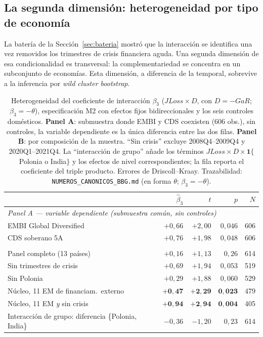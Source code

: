 \subsection{La segunda dimensión: heterogeneidad por tipo de economía}
\label{sec:hetero}

La batería de la Sección~\ref{sec:bateria} mostró que la interacción se identifica una vez removidos los trimestres de crisis financiera aguda. Una segunda dimensión de esa condicionalidad es transversal: la complementariedad se concentra en un subconjunto de economías. Esta dimensión, a diferencia de la temporal, sobrevive a la inferencia por \textit{wild cluster bootstrap}.

\begin{table}[t]
\centering
\small
\setlength{\tabcolsep}{5pt}
\caption[Heterogeneidad del coeficiente de interacción $\beta_3$]{Heterogeneidad del coeficiente de interacción $\beta_3$ ($JLoss\times D$, con $D=-GaR$; $\beta_3=-\theta$), especificación M2 con efectos fijos bidireccionales y los seis controles domésticos. \textbf{Panel A}: submuestra donde EMBI y CDS coexisten (606 obs.), sin controles, la variable dependiente es la única diferencia entre las dos filas. \textbf{Panel B}: por composición de la muestra. ``Sin crisis'' excluye 2008Q4--2009Q4 y 2020Q1--2021Q4. La ``interacción de grupo'' añade los términos $JLoss\times D\times\mathbf{1}\{$Polonia o India$\}$ y los efectos de nivel correspondientes; la fila reporta el coeficiente del triple producto. Errores de Driscoll--Kraay. Trazabilidad: \texttt{NUMEROS\_CANONICOS\_BBG.md} (en forma $\theta$; $\beta_3=-\theta$).}
\label{tab:hetero}
\begin{tabular}{lrrrr}
\toprule
 & $\hat\beta_3$ & $t$ & $p$ & $N$ \\
\midrule
\multicolumn{5}{l}{\textit{Panel A --- variable dependiente (submuestra común, sin controles)}}\\
\quad EMBI Global Diversified & $+0{,}66$ & $+2{,}00$ & $0{,}046$ & 606 \\
\quad CDS soberano 5A         & $+0{,}76$ & $+1{,}98$ & $0{,}048$ & 606 \\
\addlinespace
\multicolumn{5}{l}{\textit{Panel B --- composición de la muestra}}\\
\quad Panel completo (13 países)               & $+0{,}16$ & $+1{,}13$ & $0{,}26$  & 614 \\
\quad Sin trimestres de crisis                 & $+0{,}69$ & $+1{,}94$ & $0{,}053$ & 519 \\
\quad Sin Polonia                              & $+0{,}29$ & $+1{,}88$ & $0{,}060$ & 529 \\
\quad Núcleo, 11 EM de financiam.\ externo & $\mathbf{+0{,}47}$ & $\mathbf{+2{,}29}$ & $\mathbf{0{,}023}$ & 479 \\
\quad Núcleo, 11 EM \emph{y} sin crisis & $\mathbf{+0{,}94}$ & $\mathbf{+2{,}94}$ & $\mathbf{0{,}004}$ & 405 \\
\quad Interacción de grupo: diferencia \{Polonia, India\} & $-0{,}36$ & $-1{,}20$ & $0{,}23$ & 614 \\
\bottomrule
\end{tabular}
\end{table}

